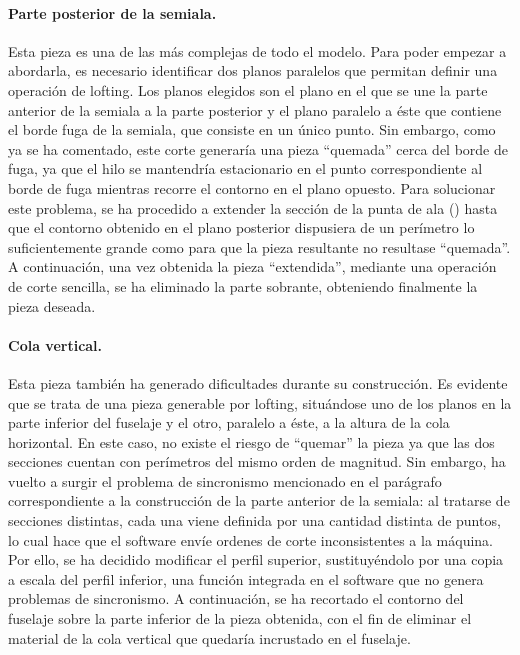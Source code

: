\paragraph{Parte posterior de la semiala.} Esta pieza es una de las más complejas de todo el modelo. Para poder empezar a abordarla, es necesario identificar dos planos paralelos que permitan definir una operación de lofting. Los planos elegidos son el plano en el que se une la parte anterior de la semiala a la parte posterior y el plano paralelo a éste que contiene el borde fuga de la semiala, que consiste en un único punto. Sin embargo, como ya se ha comentado, este corte generaría una pieza “quemada” cerca del borde de fuga, ya que el hilo se mantendría estacionario en el punto correspondiente al borde de fuga mientras recorre el contorno en el plano opuesto. Para solucionar este problema, se ha procedido a extender la sección de la punta de ala () hasta que el contorno obtenido en el plano posterior dispusiera de un perímetro lo suficientemente grande como para que la pieza resultante no resultase “quemada”. A continuación, una vez obtenida la pieza “extendida”, mediante una operación de corte sencilla, se ha eliminado la parte sobrante, obteniendo finalmente la pieza deseada.

\paragraph{Cola vertical.} Esta pieza también ha generado dificultades durante su construcción. Es evidente que se trata de una pieza generable por lofting, situándose uno de los planos en la parte inferior del fuselaje y el otro, paralelo a éste, a la altura de la cola horizontal. En este caso, no existe el riesgo de “quemar” la pieza ya que las dos secciones cuentan con perímetros del mismo orden de magnitud. Sin embargo, ha vuelto a surgir el problema de sincronismo mencionado en el parágrafo correspondiente a la construcción de la parte anterior de la semiala: al tratarse de secciones distintas, cada una viene definida por una cantidad distinta de puntos, lo cual hace que el software envíe ordenes de corte inconsistentes a la máquina. Por ello, se ha decidido modificar el perfil superior, sustituyéndolo por una copia a escala del perfil inferior, una función integrada en el software que no genera problemas de sincronismo. A continuación, se ha recortado el contorno del fuselaje sobre la parte inferior de la pieza obtenida, con el fin de eliminar el material de la cola vertical que quedaría incrustado en el fuselaje.

